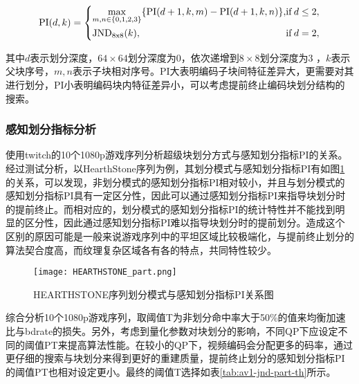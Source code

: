   \begin{equation} \label{equ:pi}
    \mathrm{PI}(d, k) =
    \begin{dcases}
      \max_{m,n\in \{0, 1, 2, 3\}} \{\mathrm{PI}(d+1, k, m) - \mathrm{PI}(d+1,k, n) \} , &\mathrm{if} \, d \leq 2,\\
      \quad \mathrm{JND_{8x8}}(k), &\mathrm{if}\, d = 2,
    \end{dcases}
  \end{equation}

  其中$d$表示划分深度，$64\times 64$划分深度为0，依次递增到$8\times 8$划分深度为3 ，$k$表示父块序号，$m, n$表示子块相对序号。PI大表明编码子块间特征差异大，更需要对其进行划分，PI小表明编码块内特征差异小，可以考虑提前终止编码块划分结构的搜索。

  \subsubsection{感知划分指标分析}

 使用twitch的10个1080p游戏序列分析超级块划分方式与感知划分指标PI的关系。经过测试分析，以HearthStone序列为例，其划分模式与感知划分指标PI有如图\ref{fig:jnd-part-PI-example}的关系，可以发现，非划分模式的感知划分指标PI相对较小，并且与划分模式的感知划分指标PI具有一定区分性，因此可以通过感知划分指标PI来指导块划分时的提前终止。而相对应的，划分模式的感知划分指标PI的统计特性并不能找到明显的区分性，因此通过感知划分指标PI难以指导块划分时的提前划分。造成这个区别的原因可能是一般来说游戏序列中的平坦区域比较极端化，与提前终止划分的算法契合度高，而纹理复杂区域各有各的特点，共同特性较少。

  \begin{figure}[!htp]
    \centering
    \texttt{[image: HEARTHSTONE\_part.png]}
    \caption{HEARTHSTONE序列划分模式与感知划分指标PI关系图}
   \label{fig:jnd-part-PI-example}
  \end{figure}

	综合分析10个1080p游戏序列，取阈值T为非划分命中率大于50\%的值来均衡加速比与bdrate的损失。另外，考虑到量化参数对块划分的影响，不同QP下应设定不同的阈值PT来提高算法性能。在较小的QP下，视频编码会分配更多的码率，通过更仔细的搜索与块划分来得到更好的重建质量，提前终止划分的感知划分指标PI的阈值PT也相对设定更小。最终的阈值T选择如表\ref{tab:av1-jnd-part-th}所示。

